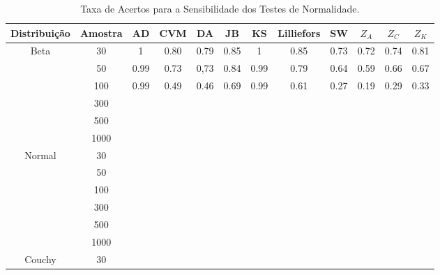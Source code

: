 \documentclass[a4paper,11pt]{article} %
\begin{document}
\begin{table}
    \centering
    \caption{Taxa de Acertos para a Sensibilidade dos Testes de Normalidade.}
    \begin{tabular}{c|c|c|c|c|c|c|c|c|c|c|c}
    \hline \hline
Distribuição              & Amostra & AD    & CVM   &  DA   & JB   &  KS   & Lilliefors  &  SW  & $Z_{A}$ & $Z_{C}$ & $Z_{K}$ \\
    \hline
\multirow{6}{*}{Beta}     & 30      &  1    & 0.80  & 0.79  & 0.85 &  1    &  0.85       & 0.73  &  0.72   &  0.74   &  0.81  \\
                          &  50     & 0.99  & 0.73  & 0,73  & 0.84 &  0.99 &  0.79       &  0.64 &  0.59   &  0.66   &  0.67  \\
                          & 100     & 0.99  & 0.49  & 0.46  & 0.69 &  0.99 &  0.61       &  0.27 &  0.19   &  0.29   &  0.33  \\
                          & 300     &    &       &       &      &     &             &      &         &         &        \\
                          & 500     &    &       &       &      &     &             &      &         &         &        \\
                          & 1000    &    &       &       &      &     &             &      &         &         &        \\
                          \hline
\multirow{6}{*}{Normal}   & 30      &    &       &       &      &     &             &      &         &         &        \\
                          &  50     &    &       &       &      &     &             &      &         &         &        \\
                          & 100     &    &       &       &      &     &             &      &         &         &        \\
                          & 300     &    &       &       &      &     &             &      &         &         &        \\
                          & 500     &    &       &       &      &     &             &      &         &         &        \\
                          & 1000    &    &       &       &      &     &             &      &         &         &        \\  
                          \hline
\multirow{6}{*}{Couchy}     & 30      &    &       &       &      &     &             &      &         &         &        \\

\end{tabular}
\end{table}
\end{document}
